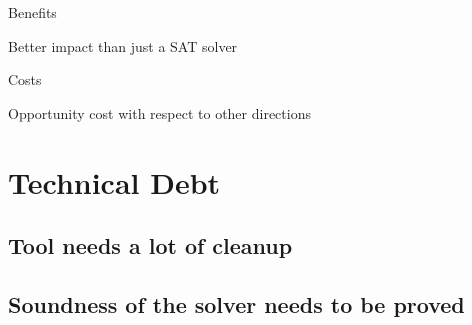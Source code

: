 \documentclass[presentation]{beamer}
\begin{document}
\begin{frame}[label={sec:org4df75fb}]{Benefits}
\begin{block}{Better impact than just a SAT solver}
\end{block}
\end{frame}

\begin{frame}[label={sec:org3b08328}]{Costs}
\begin{block}{Opportunity cost with respect to other directions}
\end{block}
\end{frame}

\section{Technical Debt}
\label{sec:org41dcd7c}

\subsection{Tool needs a lot of cleanup}
\label{sec:orgffee300}

\subsection{Soundness of the solver needs to be proved}
\label{sec:org08723af}
\end{document}
